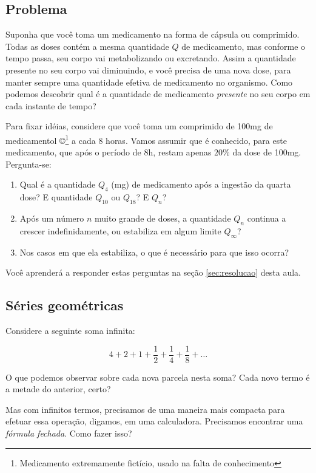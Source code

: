 \documentclass[a4paper]{article}
\begin{document}
\subsection{Problema}
\label{sec:problema}

Suponha que você toma um medicamento na forma de cápsula ou
comprimido. Todas as doses contém a mesma quantidade $Q$ de
medicamento, mas conforme o tempo passa, seu corpo vai metabolizando
ou excretando. Assim a quantidade presente no seu corpo vai
diminuindo, e você precisa de uma nova dose, para manter sempre uma
quantidade efetiva de medicamento no organismo. Como podemos descobrir
qual é a quantidade de medicamento {\em presente} no seu corpo em cada
instante de tempo?

Para fixar idéias, considere que você toma um comprimido de 100mg de
medicamentol \copyright\footnote{Medicamento extremamente fictício,
  usado na falta de conhecimento} a cada 8 horas. Vamos assumir que é
conhecido, para este medicamento, que após o período de 8h, restam
apenas $20\%$ da dose de 100mg. Pergunta-se:

\begin{enumerate}
\item Qual é a quantidade $Q_4$ (mg) de medicamento após a ingestão da
  quarta dose? E quantidade $Q_{10}$ ou $Q_{18}$? E $Q_n$?
\item Após um número $n$ muito grande de doses, a quantidade $Q_n$
  continua a crescer indefinidamente, ou estabiliza em algum limite
  $Q_\infty$?
\item Nos casos em que ela estabiliza, o que é necessário para que
  isso ocorra?
\end{enumerate}

Você aprenderá a responder estas perguntas na seção
\ref{sec:resolucao} desta aula.

\subsection{Séries geométricas}

Considere a seguinte soma infinita:

\begin{displaymath}
  4+ 2+ 1+ \frac{1}{2} +\frac{1}{4} + \frac{1}{8} + \ldots
\end{displaymath}

O que podemos observar sobre cada nova parcela nesta soma? Cada novo
termo é a metade do anterior, certo?

Mas com infinitos termos, precisamos de uma maneira mais compacta para
efetuar essa operação, digamos, em uma calculadora. Precisamos
encontrar uma {\em fórmula fechada}. Como fazer isso?
\end{document}
